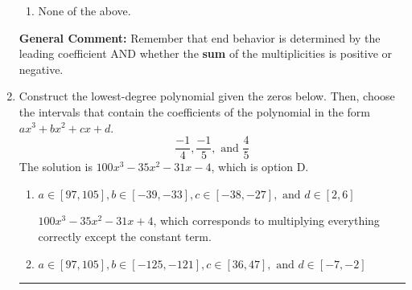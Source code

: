 \documentclass{extbook}[14pt]
\newcommand{\litem}[1]{\item #1

\rule{\textwidth}{0.4pt}}
\begin{document}
\begin{enumerate}
{\begin{enumerate}[label=\Alph*.]
\item None of the above.\end{enumerate}
\textbf{General Comment:} Remember that end behavior is determined by the leading coefficient AND whether the \textbf{sum} of the multiplicities is positive or negative.
}
\litem{
Construct the lowest-degree polynomial given the zeros below. Then, choose the intervals that contain the coefficients of the polynomial in the form $ax^3+bx^2+cx+d$.
\[ \frac{-1}{4}, \frac{-1}{5}, \text{ and } \frac{4}{5} \]The solution is \( 100x^{3} -35 x^{2} -31 x -4 \), which is option D.\begin{enumerate}[label=\Alph*.]
\item \( a \in [97, 105], b \in [-39, -33], c \in [-38, -27], \text{ and } d \in [2, 6] \)

$100x^{3} -35 x^{2} -31 x + 4$, which corresponds to multiplying everything correctly except the constant term.
\item \( a \in [97, 105], b \in [-125, -121], c \in [36, 47], \text{ and } d \in [-7, -2] \)


\end{enumerate}}
\end{enumerate}
\end{document}
